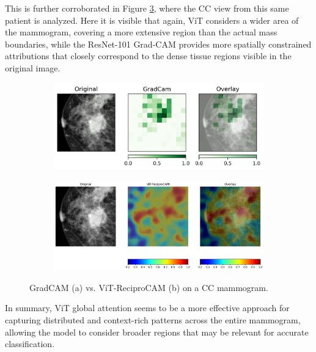 \documentclass[a4paper,10pt]{book}
\begin{document}
This is further corroborated in Figure \ref{fig:grad_vs_vit_cc}, where the CC view from this same patient is analyzed. Here it is visible that again, ViT considers a wider area of the mammogram, covering a more extensive region than the actual mass boundaries, while the ResNet-101 Grad-CAM provides more spatially constrained attributions that closely correspond to the dense tissue regions visible in the original image.



\begin{figure}[h!]
    \centering
    \begin{subfigure}[c]{0.48\textwidth}
        \centering
        \includegraphics[width=\textwidth]{reports//assets/D2-0138_CC-R_Resnet.png}
        \caption{}
        \label{fig:cc_cam}
    \end{subfigure}
    \begin{subfigure}[c]{0.48\textwidth}
        \centering
        \includegraphics[width=\textwidth]{reports//assets/D2-0138_CC-R.png}
        \caption{}
        \label{fig:cc_reci}
    \end{subfigure}
     \caption[GradCAM vs. ViT-ReciproCAM (CC view)]{GradCAM (a) vs. ViT-ReciproCAM (b) on a CC mammogram.}
    \label{fig:grad_vs_vit_cc}
\end{figure}

In summary, ViT global attention seems to be a more effective approach for capturing distributed and context-rich patterns across the entire mammogram, allowing the model to consider broader regions that may be relevant for accurate classification. 
\end{document}
